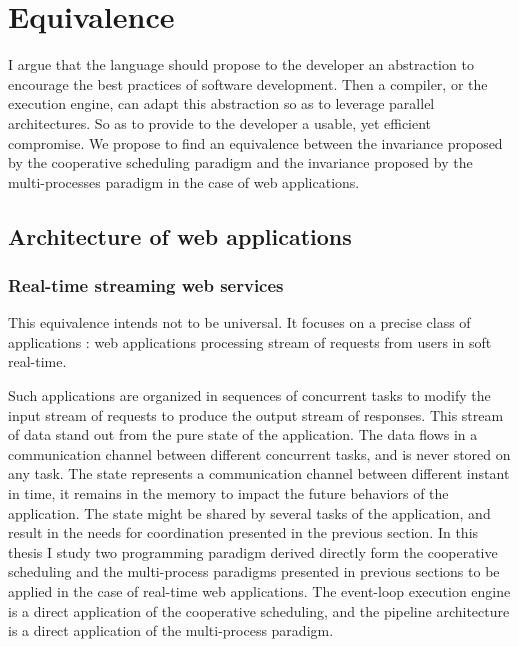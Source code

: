 \section{Equivalence}

I argue that the language should propose to the developer an abstraction to encourage the best practices of software development.
Then a compiler, or the execution engine, can adapt this abstraction so as to leverage parallel architectures. 
So as to provide to the developer a usable, yet efficient compromise.
We propose to find an equivalence between the invariance proposed by the cooperative scheduling paradigm and the invariance proposed by the multi-processes paradigm in the case of web applications.

\subsection{Architecture of web applications}

\subsubsection{Real-time streaming web services}


This equivalence intends not to be universal.
It focuses on a precise class of applications : web applications processing stream of requests from users in soft real-time.

Such applications are organized in sequences of concurrent tasks to modify the input stream of requests to produce the output stream of responses.
This stream of data stand out from the pure state of the application.
The data flows in a communication channel between different concurrent tasks, and is never stored on any task.
The state represents a communication channel between different instant in time, it remains in the memory to impact the future behaviors of the application.
The state might be shared by several tasks of the application, and result in the needs for coordination presented in the previous section.
In this thesis I study two programming paradigm derived directly form the cooperative scheduling and the multi-process paradigms presented in previous sections to be applied in the case of real-time web applications.
The event-loop execution engine is a direct application of the cooperative scheduling, and the pipeline architecture is a direct application of the multi-process paradigm.

